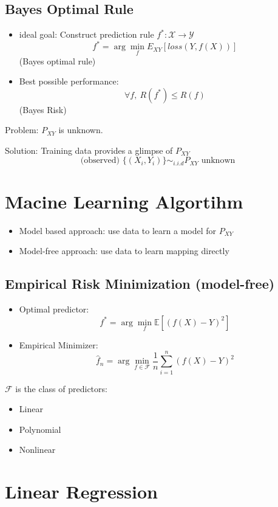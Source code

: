 \documentclass[letterpaper,10pt]{article}
\begin{document}
\subsection{Bayes Optimal Rule}

\begin{itemize}
	\item ideal goal: Construct prediction rule $f^*:\mathcal{X}\rightarrow\mathcal{Y}$
	$$f^*=\arg\min_f{E_{XY}[loss(Y,f(X))]}$$ (Bayes optimal rule)
	\item Best possible performance:
	$$\forall f,~R(f^*) \leq R(f)$$ (Bayes Risk)
\end{itemize}

Problem: $P_{XY}$ is unknown.

Solution: Training data provides a glimpse of $P_{XY}$
$$\text{(observed)~}\{(X_i,Y_i)\} \sim_{i.i.d} P_{XY}\text{~unknown}$$

\section{Macine Learning Algortihm}

\begin{itemize}
	\item Model based approach: use data to learn a model for $P_{XY}$
	\item Model-free approach: use data to learn mapping directly
\end{itemize}

\subsection{Empirical Risk Minimization (model-free)}

\begin{itemize}
	\item Optimal predictor: $$f^*=\arg\min_f{\mathbb{E}[(f(X)-Y)^2]}$$
	\item Empirical Minimizer: $$\hat{f}_n=\arg\min_{f\in\mathcal{F}}\frac{1}{n}\sum_{i=1}^{n}(f(X)-Y)^2$$
\end{itemize}

$\mathcal{F}$ is the class of predictors:
\begin{itemize}
	\item Linear
	\item Polynomial
	\item Nonlinear
\end{itemize}

\section{Linear Regression}
\end{document}
